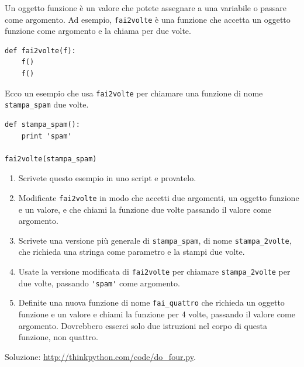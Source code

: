\documentclass[10pt]{book}
\begin{document}
\vspace{0.2in}
\begin{exercise}

Un oggetto funzione è un valore che potete assegnare a una variabile o passare come argomento. Ad esempio, \verb"fai2volte" è una funzione che accetta un oggetto funzione come argomento e la chiama per due volte.

\begin{verbatim}
def fai2volte(f):
    f()
    f()
\end{verbatim}

Ecco un esempio che usa \verb"fai2volte" per chiamare una funzione di nome \verb"stampa_spam" due volte.

\begin{verbatim}
def stampa_spam():
    print 'spam'

fai2volte(stampa_spam)
\end{verbatim}

\begin{enumerate}

\item Scrivete questo esempio in uno script e provatelo.

\item Modificate \verb"fai2volte" in modo che accetti due argomenti, un oggetto funzione e un valore, e che chiami la funzione due volte passando il valore come argomento.

\item Scrivete una versione più generale di \verb"stampa_spam", di nome
\verb"stampa_2volte", che richieda una stringa come parametro e la stampi due volte.

\item Usate la versione modificata di \verb"fai2volte" per chiamare
\verb"stampa_2volte" per due volte, passando \verb"'spam'" come argomento.

\item Definite una nuova funzione di nome \verb"fai_quattro" che richieda un oggetto funzione e un valore e chiami la funzione per 4 volte, passando il valore come argomento. Dovrebbero esserci solo due istruzioni nel corpo di questa funzione, non quattro.

\end{enumerate}

Soluzione: \url{http://thinkpython.com/code/do_four.py}.

\end{exercise}
\end{document}
